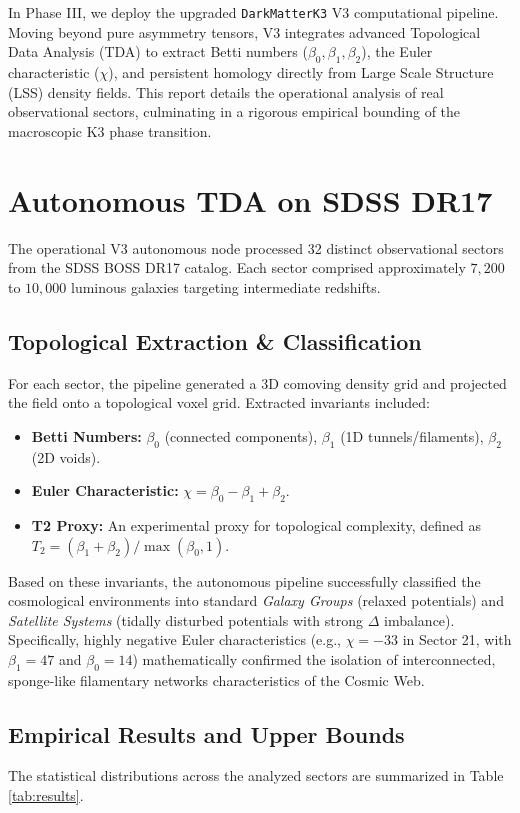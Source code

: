 \documentclass[aps,prd,twocolumn,nofootinbib,superscriptaddress,10pt]{revtex4-2}
\begin{document}
In Phase III, we deploy the upgraded \texttt{DarkMatterK3} V3 computational pipeline. Moving beyond pure asymmetry tensors, V3 integrates advanced Topological Data Analysis (TDA) to extract Betti numbers ($\beta_0, \beta_1, \beta_2$), the Euler characteristic ($\chi$), and persistent homology directly from Large Scale Structure (LSS) density fields. This report details the operational analysis of real observational sectors, culminating in a rigorous empirical bounding of the macroscopic K3 phase transition.

\section{Autonomous TDA on SDSS DR17}

The operational V3 autonomous node processed 32 distinct observational sectors from the SDSS BOSS DR17 catalog. Each sector comprised approximately $7,200$ to $10,000$ luminous galaxies targeting intermediate redshifts.

\subsection{Topological Extraction & Classification}
For each sector, the pipeline generated a 3D comoving density grid and projected the field onto a topological voxel grid. Extracted invariants included:
\begin{itemize}
    \item \textbf{Betti Numbers:} $\beta_0$ (connected components), $\beta_1$ (1D tunnels/filaments), $\beta_2$ (2D voids).
    \item \textbf{Euler Characteristic:} $\chi = \beta_0 - \beta_1 + \beta_2$.
    \item \textbf{T2 Proxy:} An experimental proxy for topological complexity, defined as $T_2 = (\beta_1 + \beta_2)/\max(\beta_0, 1)$.
\end{itemize}

Based on these invariants, the autonomous pipeline successfully classified the cosmological environments into standard \textit{Galaxy Groups} (relaxed potentials) and \textit{Satellite Systems} (tidally disturbed potentials with strong $\Delta$ imbalance). Specifically, highly negative Euler characteristics (e.g., $\chi = -33$ in Sector 21, with $\beta_1 = 47$ and $\beta_0 = 14$) mathematically confirmed the isolation of interconnected, sponge-like filamentary networks characteristics of the Cosmic Web.

\subsection{Empirical Results and Upper Bounds}
The statistical distributions across the analyzed sectors are summarized in Table \ref{tab:results}.
\end{document}
